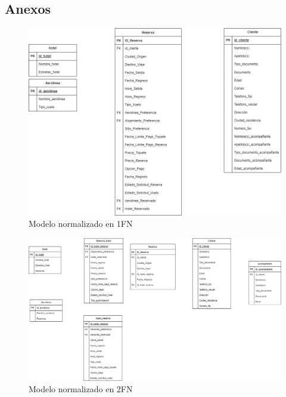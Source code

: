 \documentclass{article}
\begin{document}
\newpage




\newpage
\begin{landscape}
\section{Anexos}
\begin{figure}[H]
    \centering
    \includegraphics[scale=0.4]{img/FN1.png}
    \caption{Modelo normalizado en 1FN}
    \label{fig:NormalizacionFN1}
\end{figure}


\begin{figure}[H]
    \centering
    \includegraphics[width=0.9\linewidth]{img/FN2.png}
    \caption{Modelo normalizado en 2FN}
    \label{fig:Normalizacion2FN}
\end{figure}



\end{landscape}
\end{document}

